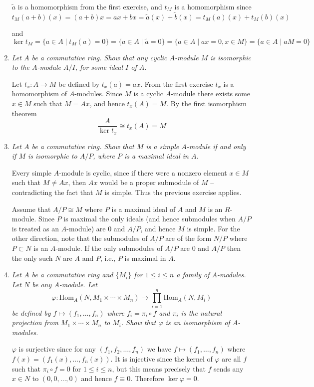 \documentclass[10pt]{article}
\newcommand{\Hom}{\text{Hom}}
\newcommand{\iso}{\cong}
\begin{document}
\begin{enumerate}
$\tilde{a}$ is a homomorphism from the first exercise, and $t_M$ is a homomorphism since $$t_M(a+b)(x) = (a+b)x = ax + bx = \tilde{a}(x) + \tilde{b}(x) = t_M(a)(x) + t_M(b)(x)$$

and
\[
\ker t_M = \{a \in A \mid t_M(a) = 0\} = \{a \in A \mid \tilde{a} = 0 \} = \{a \in A \mid ax = 0, x \in M\} = \{a \in A \mid aM = 0\}
\]
\item \emph{Let $A$ be a commutative ring.  Show that any cyclic $A$-module $M$ is isomorphic to the $A$-module $A/I$, for some ideal $I$ of $A$.}

Let $t_x: A \rightarrow M$ be defined by $t_x(a) = ax$.  From the first exercise $t_x$ is a homomorphism of $A$-modules.  Since $M$ is a cyclic $A$-module there exists some $x \in M$ such that $M = Ax$, and hence $t_x(A) = M$.  By the first isomorphism theorem $$\frac{A}{\ker t_x} \iso t_x(A) = M$$

\item \emph{Let $A$ be a commutative ring.  Show that $M$ is a simple $A$-module if and only if $M$ is isomorphic to $A/P$, where $P$ is a maximal ideal in $A$.}

Every simple $A$-module is cyclic, since if there were a nonzero element $x \in M$ such that $M \neq Ax$, then $Ax$ would be a proper submodule of $M$ -- contradicting the fact that $M$ is simple.  Thus ths previous exercise applies.

Assume that $A/P \iso M$ where $P$ is a maximal ideal of $A$ and $M$ is an $R$-module.  Since $P$ is maximal the only ideals (and hence submodules when $A/P$ is treated as an $A$-module) are $0$ and $A/P$, and hence $M$ is simple.  For the other direction, note that the submodules of $A/P$ are of the form $N/P$ where $P \subset N$ is an $A$-module.  If the only submodules of $A/P$ are $0$ and $A/P$ then the only such $N$ are $A$ and $P$, i.e., $P$ is maximal in $A$.

\item \emph{Let $A$ be a commutative ring and $\{M_i\}$ for $1 \leq i \leq n$ a family of $A$-modules.  Let $N$ be any $A$-module.  Let $$\varphi: \Hom_A(N, M_1 \times \cdots \times M_n) \rightarrow \prod_{i=1}^n \Hom_A(N,M_i)$$ be defined by $f \mapsto (f_1, \ldots, f_n)$ where $f_i = \pi_i \circ f$ and $\pi_i$ is the natural projection from $M_1 \times \cdots \times M_n$ to $M_i$.  Show that $\varphi$ is an isomorphism of $A$-modules.}

$\varphi$ is surjective since for any $(f_1, f_2, \ldots, f_n)$ we have $f \mapsto (f_1, \ldots, f_n)$ where $f(x) = (f_1(x), \ldots, f_n(x))$.  It is injective since the kernel of $\varphi$ are all $f$ such that $\pi_i \circ f = 0$ for $1 \leq i \leq n$, but this means precisely that $f$ sends any $x \in N$ to $(0, 0, \ldots, 0)$ and hence $f \equiv 0$.  Therefore $\ker \varphi = 0$.


\end{enumerate}
\end{document}
